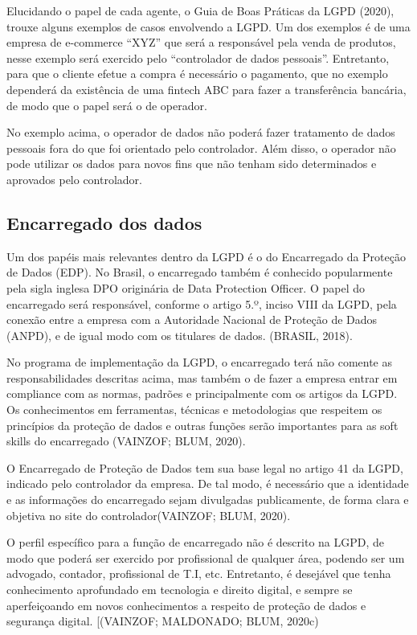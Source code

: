 \documentclass[
	12pt,				%
	openright,			%
	oneside,			%
	a4paper,			%
	english,			%
	french,				%
	spanish,			%
	brazil,				%
	]{abntex2}
\begin{document}
Elucidando o papel de cada agente, o Guia de Boas Práticas da LGPD (2020), trouxe alguns exemplos de casos envolvendo a LGPD. Um dos exemplos é de uma empresa de e-commerce “XYZ” que será a responsável pela venda de produtos, nesse exemplo será exercido pelo “controlador de dados pessoais”. Entretanto, para que o cliente efetue a compra é necessário o pagamento, que no exemplo dependerá da existência de uma fintech ABC para fazer a transferência bancária, de modo que o papel será o de operador.

No exemplo acima, o operador de dados não poderá fazer tratamento de dados pessoais fora do que foi orientado pelo controlador. Além disso, o operador não pode utilizar os dados para novos fins que não tenham sido determinados e aprovados pelo controlador.

\subsection{Encarregado dos dados}

Um dos papéis mais relevantes dentro da LGPD é o do Encarregado da Proteção de Dados (EDP). No Brasil, o encarregado também é conhecido popularmente pela sigla inglesa DPO originária de Data Protection Officer. O papel do encarregado será responsável, conforme o artigo 5.º, inciso VIII da LGPD, pela conexão entre a empresa com a Autoridade Nacional de Proteção de Dados (ANPD), e de igual modo com os titulares de dados. (BRASIL, 2018). 

No programa de implementação da LGPD, o encarregado terá não comente as responsabilidades descritas acima, mas também o de fazer a empresa entrar em compliance com as normas, padrões e principalmente com os artigos da LGPD. Os conhecimentos em ferramentas, técnicas e metodologias que respeitem os princípios da proteção de dados e outras funções serão importantes para as soft skills do encarregado (VAINZOF; BLUM, 2020).

O Encarregado de Proteção de Dados tem sua base legal no artigo 41 da LGPD, indicado pelo controlador da empresa. De tal modo, é necessário que a identidade e as informações do encarregado sejam divulgadas publicamente, de forma clara e objetiva no site do controlador(VAINZOF; BLUM, 2020).

O perfil específico para a função de encarregado não é descrito na LGPD, de modo que poderá ser exercido por profissional de qualquer área, podendo ser um advogado, contador, profissional de T.I, etc. Entretanto, é desejável que tenha conhecimento aprofundado em tecnologia e direito digital, e sempre se aperfeiçoando em novos conhecimentos a respeito de proteção de dados e segurança digital. [(VAINZOF; MALDONADO; BLUM, 2020c)
\end{document}
